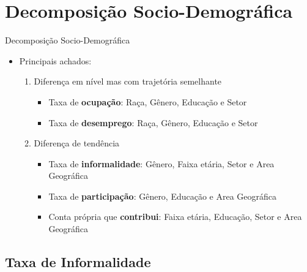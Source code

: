 \documentclass[11pt]{beamer}
\begin{document}
%

\section{Decomposição Socio-Demográfica}

\begin{frame}
\centering
{\huge Decomposição Socio-Demográfica}

\vspace{4mm}
\begin{itemize}
	\item{Principais achados:
	\vspace{3mm}
	\begin{enumerate}

		\item{Diferença em nível mas com trajetória semelhante
		\begin{itemize}
			\item{Taxa de \textbf{ocupação}: Raça, Gênero, Educação e Setor}
			\item{Taxa de \textbf{desemprego}: Raça, Gênero, Educação e Setor}
		\end{itemize}
		}
		\vspace{2mm}
		\item{Diferença de tendência
		\begin{itemize}
			\item{Taxa de \textbf{informalidade}: Gênero, Faixa etária, Setor e Area Geográfica}
			\item{Taxa de \textbf{participação}: Gênero, Educação e Area Geográfica}
			\item{Conta própria que \textbf{contribui}: Faixa etária, Educação, Setor e  Area Geográfica}
		\end{itemize}
		}
	\end{enumerate}
	}
\end{itemize}
\end{frame}

\subsection{Taxa de Informalidade}
\end{document}
